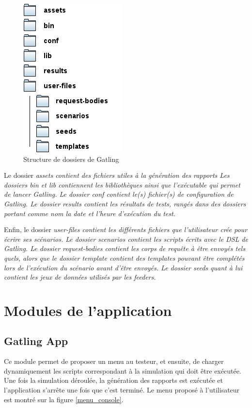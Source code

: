 \begin{figure}[h]
\begin{center}
\includegraphics{img/folders.png}
\end{center}
\caption{Structure de dossiers de Gatling}
\label{folders}
\end{figure}

Le dossier \em{assets} contient des fichiers utiles à la génération des rapports Les dossiers \em{bin} et \em{lib} contiennent les bibliothèques ainsi que l'exécutable qui permet de lancer Gatling. Le dossier \em{conf} contient le(s) fichier(s) de configuration de Gatling. Le dossier \em{results} contient les résultats de tests, rangés dans des dossiers portant comme nom la date et l'heure d'exécution du test.

Enfin, le dossier \em{user-files} contient les différents fichiers que l'utilisateur crée pour écrire ses scénarios. Le dossier \em{scenarios} contient les scripts écrits avec le DSL de Gatling. Le dossier \em{request-bodies} contient les corps de requête à être envoyés tels quels, alors que le dossier \em{template} contient des templates pouvant être complétés lors de l'exécution du scénario avant d'être envoyés. Le dossier \em{seeds} quant à lui contient les jeux de données utilisés par les feeders.

\section{Modules de l'application}
\subsection{Gatling App}
Ce module permet de proposer un menu au testeur, et ensuite, de charger dynamiquement les scripts correspondant à la simulation qui doit être exécutée. Une fois la simulation déroulée, la génération des rapports est exécutée et l'application s'arrête une fois que c'est terminé. Le menu proposé à l'utilisateur est montré sur la figure \ref{menu_console}.

